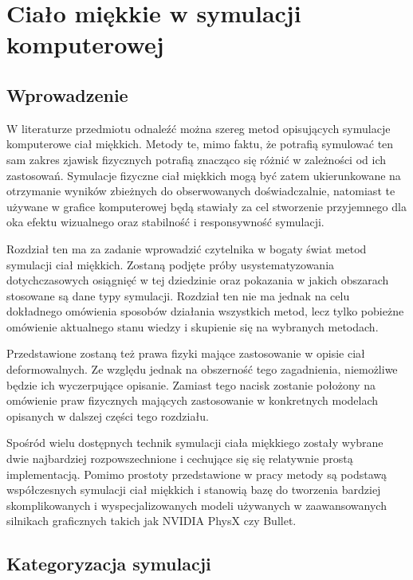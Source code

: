 \chapter{Ciało miękkie w symulacji komputerowej}

\section{Wprowadzenie}

W literaturze przedmiotu \cite{TR97-19} \cite{pbdo} \cite{survey} odnaleźć można
szereg metod opisujących symulacje komputerowe ciał miękkich. Metody te, mimo
faktu, że potrafią symulować ten sam zakres zjawisk fizycznych potrafią znacząco
się różnić w zależności od ich zastosowań.  Symulacje fizyczne ciał miękkich
mogą być zatem ukierunkowane na otrzymanie wyników zbieżnych do obserwowanych
doświadczalnie, natomiast te używane w grafice komputerowej będą stawiały za cel
stworzenie przyjemnego dla oka efektu wizualnego oraz stabilność i responsywność
symulacji.

Rozdział ten ma za zadanie wprowadzić czytelnika w bogaty świat metod symulacji
ciał miękkich. Zostaną podjęte próby usystematyzowania dotychczasowych
osiągnięć w tej dziedzinie oraz pokazania w jakich obszarach stosowane są
dane typy symulacji. Rozdział ten nie ma jednak na celu dokładnego omówienia sposobów 
działania wszystkich metod, lecz tylko pobieżne omówienie aktualnego stanu
wiedzy i skupienie się na wybranych metodach.

Przedstawione zostaną też prawa fizyki mające zastosowanie w opisie ciał deformowalnych. Ze
względu jednak na obszerność tego zagadnienia, 
niemożliwe będzie ich wyczerpujące opisanie. Zamiast tego nacisk
zostanie położony na omówienie praw fizycznych mających zastosowanie w
konkretnych modelach opisanych w dalszej części tego rozdziału.

Spośród wielu dostępnych technik symulacji ciała miękkiego zostały wybrane
dwie najbardziej rozpowszechnione i cechujące się się
relatywnie prostą implementacją. Pomimo prostoty przedstawione w pracy
metody są podstawą współczesnych symulacji ciał
miękkich i stanowią bazę do tworzenia bardziej skomplikowanych i 
wyspecjalizowanych modeli używanych w zaawansowanych silnikach graficznych
takich jak NVIDIA PhysX czy Bullet.

\section{Kategoryzacja symulacji}

